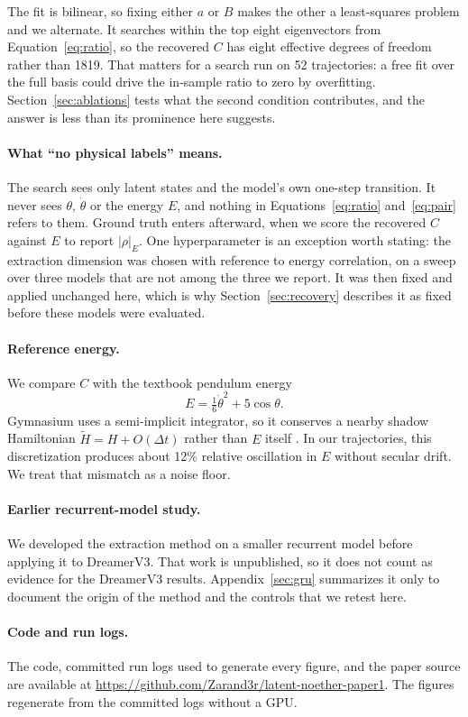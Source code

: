 The fit is bilinear, so fixing either $a$ or $B$ makes the other a least-squares problem and we
alternate. It searches within the top eight eigenvectors from Equation~\ref{eq:ratio}, so the
recovered $C$ has eight effective degrees of freedom rather than 1819. That matters for a search run
on 52 trajectories: a free fit over the full basis could drive the in-sample ratio to zero by
overfitting. Section~\ref{sec:ablations} tests what the second condition contributes, and the answer
is less than its prominence here suggests.

\paragraph{What ``no physical labels'' means.} The search sees only latent states and the model's own
one-step transition. It never sees $\theta$, $\dot\theta$ or the energy $E$, and nothing in
Equations~\ref{eq:ratio} and~\ref{eq:pair} refers to them. Ground truth enters afterward, when we
score the recovered $C$ against $E$ to report $|\rho|_E$. One hyperparameter is an exception worth
stating: the extraction dimension was chosen with reference to energy correlation, on a sweep over
three models that are not among the three we report. It was then fixed and applied unchanged here,
which is why Section~\ref{sec:recovery} describes it as fixed before these models were evaluated.

\paragraph{Reference energy.} We compare $C$ with the textbook pendulum energy
\begin{equation*}
E = \tfrac{1}{6}\dot\theta^2 + 5\cos\theta.
\end{equation*}
Gymnasium uses a semi-implicit integrator, so it conserves a nearby shadow Hamiltonian
$\tilde H = H + O(\Delta t)$ rather than $E$ itself \citep{hairer2006geometric}. In our trajectories,
this discretization produces about 12\% relative oscillation in $E$ without secular drift. We treat
that mismatch as a noise floor.

\paragraph{Earlier recurrent-model study.} We developed the extraction method on a smaller recurrent
model before applying it to DreamerV3. That work is unpublished, so it does not count as evidence
for the DreamerV3 results. Appendix~\ref{sec:gru} summarizes it only to document the origin of the
method and the controls that we retest here.

\paragraph{Code and run logs.} The code, committed run logs used to generate every figure, and the
paper source are available at \url{https://github.com/Zarand3r/latent-noether-paper1}. The figures
regenerate from the committed logs without a GPU.
